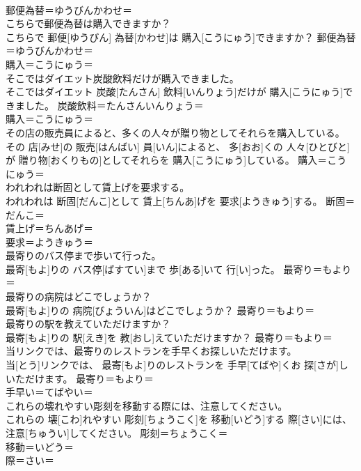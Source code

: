 \documentclass[8pt]{extreport}
\begin{document}
\begin{CJK}{UTF8}{min}
\\	郵便為替＝ゆうびんかわせ＝ 
\\	こちらで郵便為替は購入できますか？	
\\	こちらで 郵便[ゆうびん] 為替[かわせ]は 購入[こうにゅう]できますか？	郵便為替＝ゆうびんかわせ＝ 
\\	購入＝こうにゅう＝ 
\\	そこではダイエット炭酸飲料だけが購入できました。	
\\	そこではダイエット 炭酸[たんさん] 飲料[いんりょう]だけが 購入[こうにゅう]できました。	炭酸飲料＝たんさんいんりょう＝ 
\\	購入＝こうにゅう＝ 
\\	その店の販売員によると、多くの人々が贈り物としてそれらを購入している。	
\\	その 店[みせ]の 販売[はんばい] 員[いん]によると、 多[おお]くの 人々[ひとびと]が 贈り物[おくりもの]としてそれらを 購入[こうにゅう]している。	購入＝こうにゅう＝ 
\\	われわれは断固として賃上げを要求する。	
\\	われわれは 断固[だんこ]として 賃上[ちんあ]げを 要求[ようきゅう]する。	断固＝だんこ＝ 
\\	賃上げ＝ちんあげ＝ 
\\	要求＝ようきゅう＝ 
\\	最寄りのバス停まで歩いて行った。	
\\	最寄[もよ]りの バス停[ばすてい]まで 歩[ある]いて 行[い]った。	最寄り＝もより＝ 
\\	最寄りの病院はどこでしょうか？	
\\	最寄[もよ]りの 病院[びょういん]はどこでしょうか？	最寄り＝もより＝ 
\\	最寄りの駅を教えていただけますか？	
\\	最寄[もよ]りの 駅[えき]を 教[おし]えていただけますか？	最寄り＝もより＝ 
\\	当リンクでは、最寄りのレストランを手早くお探しいただけます。	
\\	当[とう]リンクでは、 最寄[もよ]りのレストランを 手早[てばや]くお 探[さが]しいただけます。	最寄り＝もより＝ 
\\	手早い＝てばやい＝ 
\\	これらの壊れやすい彫刻を移動する際には、注意してください。	
\\	これらの 壊[こわ]れやすい 彫刻[ちょうこく]を 移動[いどう]する 際[さい]には、 注意[ちゅうい]してください。	彫刻＝ちょうこく＝ 
\\	移動＝いどう＝ 
\\	際＝さい＝ 

\end{CJK}
\end{document}
